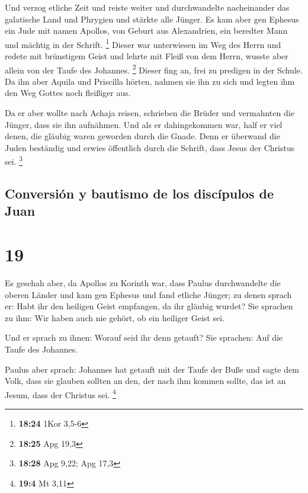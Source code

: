  Und verzog etliche Zeit und reiste weiter und
durchwandelte nacheinander das galatische Land und Phrygien und stärkte
alle Jünger.  Es kam aber gen Ephesus ein Jude mit namen
Apollos, von Geburt aus Alexandrien, ein beredter Mann und mächtig in
der Schrift. \footnote{\textbf{18:24} 1Kor 3,5-6}  Dieser
war unterwiesen im Weg des Herrn und redete mit brünstigem Geist und
lehrte mit Fleiß von dem Herrn, wusste aber allein von der Taufe des
Johannes. \footnote{\textbf{18:25} Apg 19,3}  Dieser fing
an, frei zu predigen in der Schule. Da ihn aber Aquila und Priscilla
hörten, nahmen sie ihn zu sich und legten ihm den Weg Gottes noch
fleißiger aus.

 Da er aber wollte nach Achaja reisen, schrieben die
Brüder und vermahnten die Jünger, dass sie ihn aufnähmen. Und als er
dahingekommen war, half er viel denen, die gläubig waren geworden durch
die Gnade.  Denn er überwand die Juden beständig und
erwies öffentlich durch die Schrift, dass Jesus der Christus sei.
\footnote{\textbf{18:28} Apg 9,22; Apg 17,3}

\hypertarget{conversiuxf3n-y-bautismo-de-los-discuxedpulos-de-juan}{%
\subsection{Conversión y bautismo de los discípulos de
Juan}\label{conversiuxf3n-y-bautismo-de-los-discuxedpulos-de-juan}}

\hypertarget{section-18}{%
\section{19}\label{section-18}}

 Es geschah aber, da Apollos zu Korinth war, dass Paulus
durchwandelte die oberen Länder und kam gen Ephesus und fand etliche
Jünger;  zu denen sprach er: Habt ihr den heiligen Geist
empfangen, da ihr gläubig wurdet? Sie sprachen zu ihm: Wir haben auch
nie gehört, ob ein heiliger Geist sei.

 Und er sprach zu ihnen: Worauf seid ihr denn getauft? Sie
sprachen: Auf die Taufe des Johannes.

 Paulus aber sprach: Johannes hat getauft mit der Taufe
der Buße und sagte dem Volk, dass sie glauben sollten an den, der nach
ihm kommen sollte, das ist an Jesum, dass der Christus sei. \footnote{\textbf{19:4}
  Mt 3,11}

